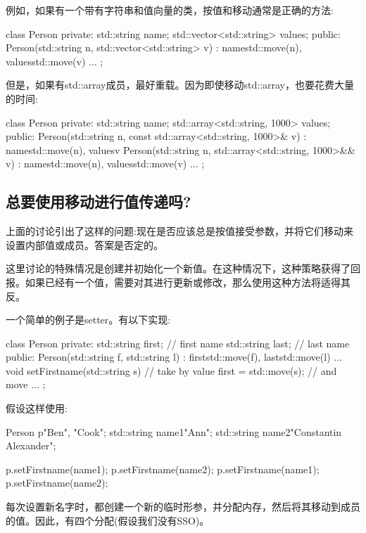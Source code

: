 例如，如果有一个带有字符串和值向量的类，按值和移动通常是正确的方法:

\begin{cppcode}
class Person {
private:
	std::string name;
	std::vector<std::string> values;
public:
	Person(std::string n, std::vector<std::string> v)
	: name{std::move(n)}, values{std::move(v)} {
	}
	...
};
\end{cppcode}

但是，如果有std::array成员，最好重载。因为即使移动std::array，也要花费大量的时间:

\begin{cppcode}
class Person {
private:
	std::string name;
	std::array<std::string, 1000> values;
public:
	Person(std::string n, const std::array<std::string, 1000>& v)
	: name{std::move(n)}, values{v} {
	}
	Person(std::string n, std::array<std::string, 1000>&& v)
	: name{std::move(n)}, values{std::move(v)} {
	}
	...
};
\end{cppcode}

\subsection{总要使用移动进行值传递吗?}

上面的讨论引出了这样的问题:现在是否应该总是按值接受参数，并将它们移动来设置内部值或成员。答案是否定的。

这里讨论的特殊情况是创建并初始化一个新值。在这种情况下，这种策略获得了回报。如果已经有一个值，需要对其进行更新或修改，那么使用这种方法将适得其反。

一个简单的例子是setter。有以下实现:

\begin{cppcode}
class Person {
private:
	std::string first; // first name
	std::string last; // last name
public:
	Person(std::string f, std::string l)
	: first{std::move(f)}, last{std::move(l)} {
	}
	...
	void setFirstname(std::string s) { // take by value
		first = std::move(s); // and move
	}
	...
};
\end{cppcode}

假设这样使用:

\begin{cppcode}
Person p{"Ben", "Cook"};
std::string name1{"Ann"};
std::string name2{"Constantin Alexander"};

p.setFirstname(name1);
p.setFirstname(name2);
p.setFirstname(name1);
p.setFirstname(name2);
\end{cppcode}

每次设置新名字时，都创建一个新的临时形参，并分配内存，然后将其移动到成员的值。因此，有四个分配(假设我们没有SSO)。

